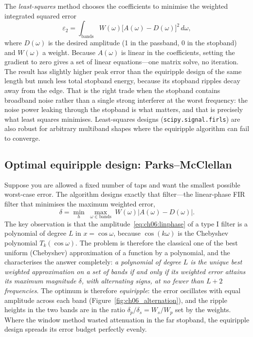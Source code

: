 The \emph{least-squares} method chooses the coefficients to minimise the weighted integrated
squared error
\begin{equation}
\varepsilon_2=\int_{\text{bands}}W(\omega)\bigl[A(\omega)-D(\omega)\bigr]^2\,d\omega,
\end{equation}
where $D(\omega)$ is the desired amplitude (1 in the passband, 0 in the stopband) and $W(\omega)$ a
weight. Because $A(\omega)$ is linear in the coefficients, setting the gradient to zero gives a set
of linear equations---one matrix solve, no iteration. The result has slightly higher peak error
than the equiripple design of the same length but much less total stopband energy, because its
stopband ripples decay away from the edge. That is the right trade when the stopband contains
broadband noise rather than a single strong interferer at the worst frequency: the noise power
leaking through the stopband is what matters, and that is precisely what least squares minimises.
Least-squares designs (\texttt{scipy.signal.firls}) are also robust for arbitrary multiband shapes
where the equiripple algorithm can fail to converge.

\subsection{Optimal equiripple design: Parks--McClellan}

Suppose you are allowed a fixed number of taps and want the smallest possible worst-case error. The
 algorithm designs exactly that filter---the linear-phase FIR filter that
minimises the maximum weighted error,
\begin{equation}
\delta=\min_{h}\;\max_{\omega\in\text{bands}}\;W(\omega)\bigl|A(\omega)-D(\omega)\bigr|.
\end{equation}
The key observation is that the amplitude~\eqref{eq:ch06:linphase} of a type I filter is a
polynomial of degree $L$ in $x=\cos\omega$, because $\cos(k\omega)$ is the Chebyshev polynomial
$T_k(\cos\omega)$. The problem is therefore the classical one of the best uniform (Chebyshev)
approximation of a function by a polynomial, and the  characterises the
answer completely: \emph{a polynomial of degree $L$ is the unique best weighted approximation on a
set of bands if and only if its weighted error attains its maximum magnitude $\delta$, with
alternating signs, at no fewer than $L+2$ frequencies}. The optimum is therefore
\emph{equiripple}: the error oscillates with equal amplitude across each band
(Figure~\ref{fig:ch06_alternation}), and the ripple heights in the two bands are in the ratio
$\delta_p/\delta_s=W_s/W_p$ set by the weights. Where the window method wasted attenuation in the
far stopband, the equiripple design spreads its error budget perfectly evenly.

